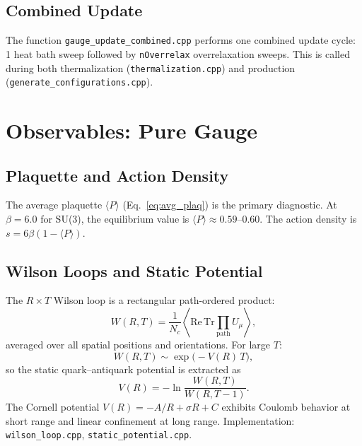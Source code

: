 \documentclass[12pt]{article}
\newcommand{\ReTr}{\mathrm{Re\,Tr}}
\newcommand{\code}[1]{\texttt{#1}}
\begin{document}
\subsection{Combined Update}

The function \code{gauge\_update\_combined.cpp} performs one combined update cycle: 1 heat bath sweep followed by \code{nOverrelax} overrelaxation sweeps. This is called during both thermalization (\code{thermalization.cpp}) and production (\code{generate\_configurations.cpp}).


\section{Observables: Pure Gauge}
\label{sec:observables}

\subsection{Plaquette and Action Density}

The average plaquette $\langle P \rangle$ (Eq.~\ref{eq:avg_plaq}) is the primary diagnostic. At $\beta = 6.0$ for SU(3), the equilibrium value is $\langle P \rangle \approx 0.59$--$0.60$. The action density is $s = 6\beta(1 - \langle P \rangle)$.

\subsection{Wilson Loops and Static Potential}

The $R \times T$ Wilson loop is a rectangular path-ordered product:
\begin{equation}
W(R, T) = \frac{1}{N_c} \left\langle \ReTr \prod_{\text{path}} U_\mu \right\rangle,
\end{equation}
averaged over all spatial positions and orientations. For large $T$:
\begin{equation}
\label{eq:wilson_decay}
W(R, T) \sim \exp\!\big(-V(R) \, T\big),
\end{equation}
so the static quark--antiquark potential is extracted as
\begin{equation}
\label{eq:static_pot}
V(R) = -\ln \frac{W(R, T)}{W(R, T-1)}.
\end{equation}
The Cornell potential $V(R) = -A/R + \sigma R + C$ exhibits Coulomb behavior at short range and linear confinement at long range. Implementation: \code{wilson\_loop.cpp}, \code{static\_potential.cpp}.
\end{document}
